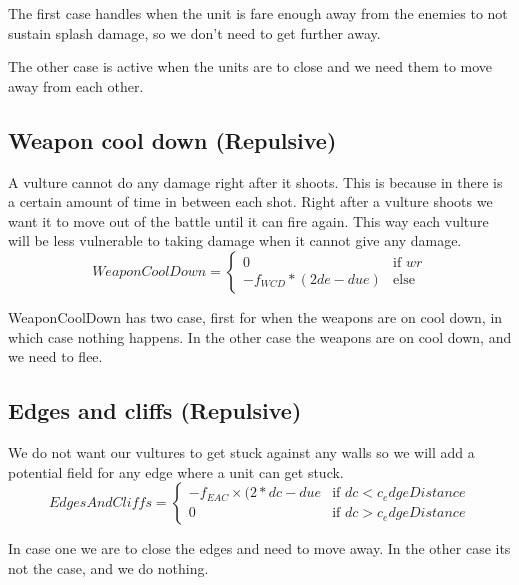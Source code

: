 	The first case handles when the unit is fare enough away from the enemies to not sustain splash damage, so we don't need to get further away.
	
	The other case is active when the units are to close and we need them to move away from each other.
	
	\subsection*{Weapon cool down (Repulsive)}
A vulture cannot do any damage right after it shoots. This is because in there is a certain amount of time in between each shot. Right after a vulture shoots we want it to move out of the battle until it can fire again. This way each vulture will be less vulnerable to taking damage when it cannot give any damage.
		\begin{displaymath}
			WeaponCoolDown = \begin{cases}
					0 & \text{if } wr\\
					-f_{WCD} * (2de - due) & \text{else}
				\end{cases}		
		\end{displaymath}

    WeaponCoolDown has two case, first for when the weapons are on cool down, in which case nothing happens. In the other case the weapons are on cool down, and we need to flee.        
    
	\subsection*{Edges and cliffs (Repulsive)}
		We do not want our vultures to get stuck against any walls so we will add a potential field for any edge where a unit can get stuck.
		\begin{displaymath}
			EdgesAndCliffs = \begin{cases}
					-f_{EAC} \times {(2*dc - due} & \text{if } dc < c_edgeDistance\\
					0 & \text{if } dc > c_edgeDistance
				\end{cases}		
		\end{displaymath}

    In case one we are to close the edges and need to move away. In the other case its not the case, and we do nothing.   

